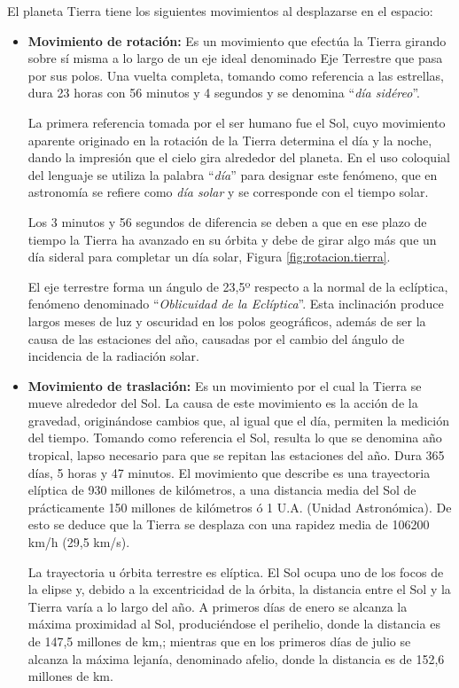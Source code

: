 El planeta Tierra tiene los siguientes movimientos al desplazarse en el espacio:

\begin{itemize}
	\item \textbf{Movimiento de rotaci\'on:} Es un movimiento que efectúa la Tierra girando sobre sí misma a lo largo de un eje ideal denominado Eje Terrestre que pasa por sus polos. Una vuelta completa, tomando como referencia a las estrellas, dura 23 horas con 56 minutos y 4 segundos y se denomina ``\emph{día sid\'ereo}''. 



La primera referencia tomada por el ser humano fue el Sol, cuyo movimiento aparente originado en la rotación de la Tierra determina el día y la noche, dando la impresión que el cielo gira alrededor del planeta. En el uso coloquial del lenguaje se utiliza la palabra ``\emph{día}'' para designar este fenómeno, que en astronomía se refiere como \emph{día solar} y se corresponde con el tiempo solar.

Los 3 minutos y 56 segundos de diferencia se deben a que en ese plazo de tiempo la Tierra ha avanzado en su órbita y debe de girar algo más que un día sideral para completar un día solar, Figura \ref{fig:rotacion.tierra}.



El eje terrestre forma un ángulo de 23,5º respecto a la normal de la eclíptica, fenómeno denominado ``\emph{Oblicuidad de la Eclíptica}''. Esta inclinación produce largos meses de luz y oscuridad en los polos geográficos, además de ser la causa de las estaciones del año, causadas por el cambio del ángulo de incidencia de la radiación solar.

        \item \textbf{Movimiento de traslación:} Es un movimiento por el cual la Tierra se mueve alrededor del Sol. La causa de este movimiento es la acción de la gravedad, originándose cambios que, al igual que el día, permiten la medición del tiempo. Tomando como referencia el Sol, resulta lo que se denomina año tropical, lapso necesario para que se repitan las estaciones del año. Dura 365 días, 5 horas y 47 minutos. El movimiento que describe es una trayectoria elíptica de 930 millones de kilómetros, a una distancia media del Sol de prácticamente 150 millones de kilómetros ó 1 U.A. (Unidad Astronómica). De esto se deduce que la Tierra se desplaza con una rapidez media de 106200 km/h (29,5 km/s).

La trayectoria u órbita terrestre es elíptica. El Sol ocupa uno de los focos de la elipse y, debido a la excentricidad de la órbita, la distancia entre el Sol y la Tierra varía a lo largo del año. A primeros días de enero se alcanza la máxima proximidad al Sol, produciéndose el perihelio, donde la distancia es de 147,5 millones de km,; mientras que en los primeros días de julio se alcanza la máxima lejanía, denominado afelio, donde la distancia es de 152,6 millones de km.


\end{itemize}
